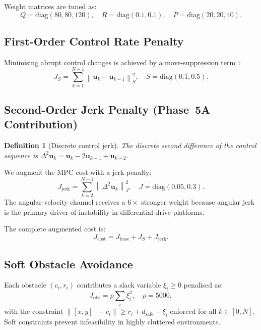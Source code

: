 \documentclass[journal]{IEEEtran}
\newtheorem{definition}{Definition}
\newcommand{\norm}[1]{\left\lVert#1\right\rVert}
\begin{document}
Weight matrices are tuned as:
\[
  Q = \mathrm{diag}(80, 80, 120),\quad
  R = \mathrm{diag}(0.1, 0.1),\quad
  P = \mathrm{diag}(20, 20, 40).
\]

\subsection{First-Order Control Rate Penalty}

Minimising abrupt control changes is achieved by a move-suppression term~\cite{rawlings2017}:
\begin{equation}
  J_S = \sum_{k=1}^{N-1} \norm{\mathbf{u}_k - \mathbf{u}_{k-1}}_{S}^2,\quad
  S = \mathrm{diag}(0.1, 0.5).
\end{equation}

\subsection{Second-Order Jerk Penalty (Phase~5A Contribution)}

\begin{definition}[Discrete control jerk]
  The discrete second difference of the control sequence is
  \(\Delta^2\mathbf{u}_k = \mathbf{u}_k - 2\mathbf{u}_{k-1} + \mathbf{u}_{k-2}\).
\end{definition}

We augment the MPC cost with a jerk penalty:
\begin{equation}\label{eq:jerk_cost}
  J_{\mathrm{jerk}} = \sum_{k=2}^{N-1}\norm{\Delta^2\mathbf{u}_k}_{J}^2,\quad
  J = \mathrm{diag}(0.05, 0.3).
\end{equation}
The angular-velocity channel receives a \(6\times\) stronger weight because
angular jerk is the primary driver of instability in differential-drive
platforms.

The complete augmented cost is:
\begin{equation}\label{eq:full_cost}
  J_{\mathrm{cost}} = J_{\mathrm{base}} + J_S + J_{\mathrm{jerk}}.
\end{equation}

\subsection{Soft Obstacle Avoidance}

Each obstacle \((c_i, r_i)\) contributes a slack variable
\(\xi_i \geq 0\) penalised as:
\begin{equation}
  J_{\mathrm{obs}} = \rho \sum_{i}\xi_i^2,\quad \rho = 5000,
\end{equation}
with the constraint \(\|[x,y]^\top - c_i\| \geq r_i + d_{\mathrm{safe}} - \xi_i\)
enforced for all \(k \in [0,N]\).
Soft constraints prevent infeasibility in highly cluttered environments.
\end{document}
